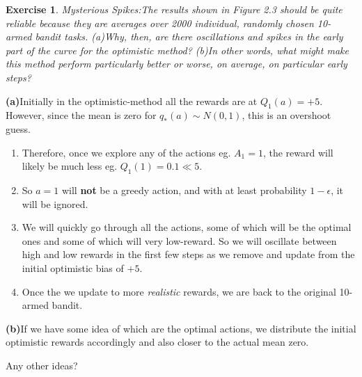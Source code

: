 \documentclass[answers]{exam}
\newtheorem{exercise}[theorem]{Exercise}
\newcommand{\tom}[1]{{\color{blue} #1}}
\theoremstyle{definition}
\theoremstyle{remark}
\begin{document}
\begin{exercise}
\textit{Mysterious Spikes:}The results shown in Figure 2.3 should be quite reliable because they are averages over 2000 individual, randomly chosen 10-armed bandit tasks. (a)Why, then, are there oscillations and spikes in the early part of the curve for the optimistic method? (b)In other words, what might make this method perform particularly better or worse, on average, on particular
early steps?
    
\end{exercise}
\begin{solution}
\textbf{(a)}Initially in the optimistic-method all the rewards are at $Q_{1}(a)=+5$. However, since the mean is zero for $q_{*}(a)\sim N(0,1)$, this is an overshoot guess.
\begin{enumerate}
    \item  Therefore, once we explore any of the actions eg. $A_{1}=1$, the reward will likely be much less eg. $Q_{1}(1)=0.1\ll 5$. 
    
    \item So $a=1$ will \textbf{not} be a greedy action, and with at least probability $1-\epsilon$, it will be ignored. 

    \item We will quickly go through all the actions, some of which will be the optimal ones and some of which will very low-reward. So we will oscillate between high and low rewards in the first few steps as we remove and update from the initial optimistic bias of $+5$.

    \item Once the we update to more \textit{realistic} rewards, we are back to the original 10-armed bandit.
    
\end{enumerate}
\textbf{(b)}If we have some idea of which are the optimal actions, we distribute the initial optimistic rewards accordingly and also closer to the actual mean zero.

\tom{Any other ideas?}



\end{solution}
\end{document}
